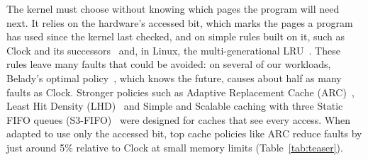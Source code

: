 \documentclass{article}
\newcommand{\clock}{Clock\xspace}
\newcommand{\belady}{Belady\xspace}
\begin{document}
The kernel must choose without knowing which pages the program will need next. It relies on the hardware's accessed bit, which marks the pages a program has used since the kernel last checked, and on simple rules built on it, such as \clock and its successors~\citep{corbato1968paging,carr1981wsclock} and, in Linux, the multi-generational LRU~\citep{linux_mglru}. These rules leave many faults that could be avoided: on several of our workloads, \belady's optimal policy~\citep{belady1966study}, which knows the future, causes about half as many faults as \clock. Stronger policies such as Adaptive Replacement Cache (ARC)~\citep{megiddo2003arc}, Least Hit Density (LHD)~\citep{beckmann2018lhd} and Simple and Scalable caching with three Static FIFO queues (S3-FIFO)~\citep{yang2023s3fifo} were designed for caches that see every access. When adapted to use only the accessed bit, top cache policies like ARC reduce faults by just around 5\% relative to \clock at small memory limits (Table~\ref{tab:teaser}).
\end{document}

